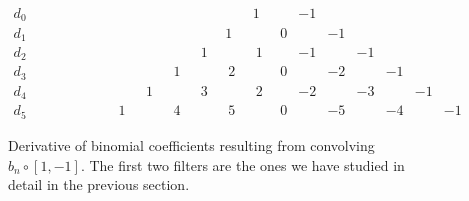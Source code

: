 \begin{figure}[h]
	\centerline{
		$\begin{array}{ccccccccccccccccccccccccl}
				d_0 & ~ & ~ & ~ & ~ & ~ & ~    & ~    & ~    & ~    & ~    & ~~1  & ~~~ & -1  & ~  & ~  & ~  & ~  & ~  & ~ & ~ & ~ & ~ & ~ & \\
				d_1 & ~ & ~ & ~ & ~ & ~ & ~    & ~    & ~    & ~    & ~~1  & ~    & ~~0 & ~   & -1 & ~  & ~  & ~  & ~  & ~ & ~ & ~ & ~ & ~ & \\
				d_2 & ~ & ~ & ~ & ~ & ~ & ~    & ~    & ~    & ~~~1 & ~    & ~~~1 & ~~~ & -1  & ~  & -1 & ~  & ~  & ~  & ~ & ~ & ~ & ~ & ~ & \\
				d_3 & ~ & ~ & ~ & ~ & ~ & ~    & ~    & ~~~1 & ~    & ~~~2 & ~    & ~~0 & ~~~ & -2 & ~  & -1 & ~  & ~  & ~ & ~ & ~ & ~ & ~ & \\
				d_4 & ~ & ~ & ~ & ~ & ~ & ~    & ~~~1 & ~    & ~~~3 & ~    & ~~~2 & ~~~ & -2  & ~  & -3 & ~  & -1 & ~  & ~ & ~ & ~ & ~ & ~ & \\
				d_5 & ~ & ~ & ~ & ~ & ~ & ~~~1 & ~    & ~~~4 & ~    & ~~~5 & ~    & ~~0 & ~   & -5 & ~  & -4 & ~  & -1 & ~ & ~ & ~ & ~ & ~ &
			\end{array}$
	}
	\caption{Derivative of binomial coefficients resulting from convolving $b_n \circ \left[1, -1\right]$. The first two filters are the ones we have studied in detail in the previous section.}
	\label{fig:derivativepascaltriangle}
\end{figure}

